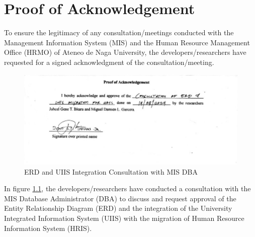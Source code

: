 \chapter{Proof of Acknowledgement}

\label{proof-acknowledgement}

To ensure the legitimacy of any consultation/meetings conducted with the Management Information System (MIS) and the Human Resource Management Office (HRMO) of Ateneo de Naga University, the developers/researchers have requested for a signed acknowledgment of the consultation/meeting. 

\begin{figure}[H]
    \centering
    \includegraphics[width=1\textwidth]{figures/images/erd-consultation.JPG}
    \caption{ERD and UIIS Integration Consultation with MIS DBA}
    \label{fig:proof-ack-erd-consultation}
\end{figure}

In figure \ref{fig:proof-ack-erd-consultation}, the developers/researchers have conducted a consultation with the MIS Database Administrator (DBA) to discuss and request approval of the Entity Relationship Diagram (ERD) and the integration of the University Integrated Information System (UIIS) with the migration of Human Resource Information System (HRIS).